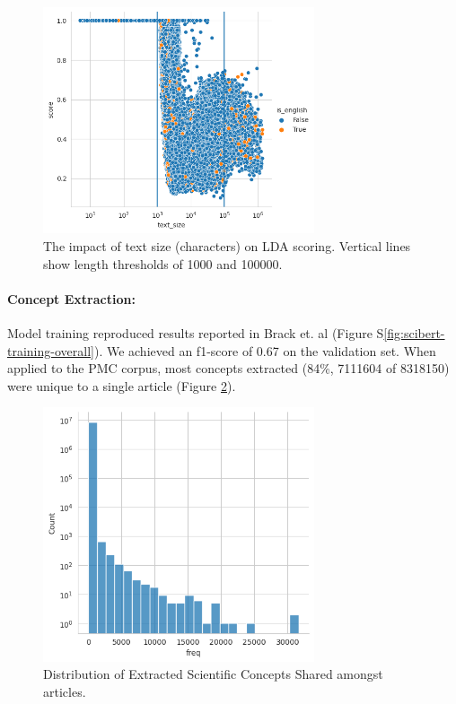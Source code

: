 \documentclass[11pt,a4paper]{article}
\begin{document}
\begin{figure}
    \centering
    \includegraphics[width=8cm]{images/pmc.lda_coherence.text_size.scatter.png}
    \caption{The impact of text size (characters) on LDA scoring. Vertical lines show length thresholds of 1000 and 100000.}
    \label{fig:lda-vs-text-size}
\end{figure}

\paragraph{Concept Extraction:} 
Model training reproduced results reported in Brack et. al (Figure S\ref{fig:scibert-training-overall}). We achieved an f1-score of 0.67 on the validation set.
When applied to the PMC corpus, most concepts extracted (84\%, 7111604 of 8318150)  were unique to a single article (Figure \ref{fig:concepts-distribution}). 

\begin{figure}
    \centering
    \includegraphics[width=8cm]{images/pmc.concepts.dist.png}
    \caption{Distribution of Extracted Scientific Concepts Shared amongst articles. }
    \label{fig:concepts-distribution}
\end{figure}
\end{document}
